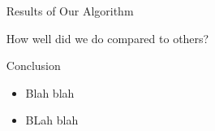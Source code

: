 \documentclass[final,t]{beamer}
\begin{document}
\begin{frame}{}
\begin{columns}[t]
\begin{column}{.3\linewidth}

    \end{column}

    
    \begin{column}{.3\linewidth}

      \begin{block}{Results of Our Algorithm}
        
        How well did we do compared to others?
      \end{block}
      
  
        
                
      \begin{block}{Conclusion}
        \begin{itemize}
        \item Blah blah
        \item BLah blah
        \end{itemize}
        \vspace{-1ex}
      \end{block}

    \end{column}
  \end{columns}
\end{frame}
\end{document}
